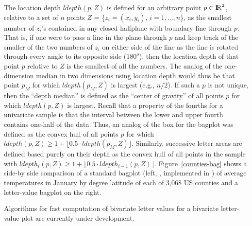 \documentclass[oneside]{article}
\newcommand{\Reals}{{\rm I\kern-.1667em{}R}}
\begin{document}
The location depth $ldepth(p,Z)$ is defined for an arbitrary point $p \in \Reals^2$, relative to a set of $n$ points $Z$ = \{$z_i = (x_i, y_i)$, $i = 1,...,n$\}, as the smallest number of $z_i$'s contained in any closed halfplane with boundary line through $p$. That is, if one were to pass a line in the plane through $p$ and keep track of the smaller of the two numbers of $z_i$ on either side of the line as the line is rotated through every angle to its opposite side ($180^o$), then the location depth of that point $p$ relative to $Z$ is the smallest of all the numbers. The analog of the one-dimension median in two dimensions using location depth would thus be that point $p_M$ for which $ldepth(p_M, Z)$ is largest (e.g., $n/2$). If such a $p$ is not unique, then the ``depth median'' is defined as the ``center of gravity'' of all points $p$ for which $ldepth(p,Z)$ is largest. Recall that a property of the fourths for a univariate sample is that the interval between the lower and upper fourth contains one-half of the data. Thus, an analog of the box for the bagplot was defined as the convex hull of all points $p$ for which $ldepth(p,Z) \ge 1 +  \lfloor 0.5 \cdot  ldepth(p_M, Z) \rfloor$. Similarly,  successive letter areas are defined based purely on their depth as the convex hull of all points in the sample with $ldepth_i(p,Z) \ge 1 +  \lfloor 0.5 \cdot  ldepth_{i-1}(p, Z) \rfloor$.
Figure~\ref{counties-bag} shows a side-by side comparison of a standard bagplot (left, \citet{bagplots}, implemented in \citet{aplpack}) of average temperatures in January by degree latitude of each of 3,068 US counties and a letter-value bagplot on the right.

Algorithms for fast computation of bivariate letter values for a bivariate letter-value plot are currently under development.
\end{document}

